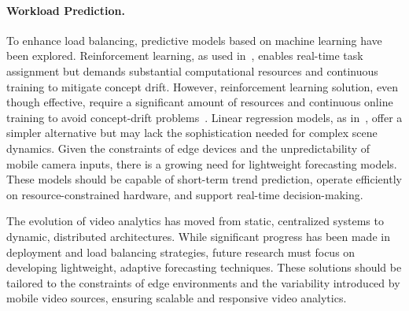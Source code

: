 \paragraph{Workload Prediction.}

To enhance load balancing, predictive models based on machine learning have been explored. Reinforcement learning, as used in~\cite{yuan2021online}, enables real-time task assignment but demands substantial computational resources and continuous training to mitigate concept drift. However, reinforcement learning solution, even though effective, require a significant amount of resources and continuous online training to avoid concept-drift problems~\cite{zhang2020reinforcement}. Linear regression models, as in~\cite{kombi2017preventive}, offer a simpler alternative but may lack the sophistication needed for complex scene dynamics.
Given the constraints of edge devices and the unpredictability of mobile camera inputs, there is a growing need for lightweight forecasting models. These models should be capable of short-term trend prediction, operate efficiently on resource-constrained hardware, and support real-time decision-making.


The evolution of video analytics has moved from static, centralized systems to dynamic, distributed architectures. While significant progress has been made in deployment and load balancing strategies, future research must focus on developing lightweight, adaptive forecasting techniques. These solutions should be tailored to the constraints of edge environments and the variability introduced by mobile video sources, ensuring scalable and responsive video analytics.




